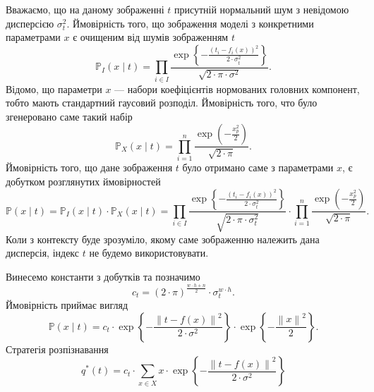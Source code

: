 Вважаємо, що на даному зображенні $t$
присутній нормальний шум з невідомою дисперсією $\sigma^2_t$.
Ймовірність того, що зображення моделі з конкретними параметрами $x$
є очищеним від шумів зображенням $t$
\begin{equation*}
  \mathbb{P}_I\left( x \mid t \right)
  = \prod_{i \in I}
    \frac{\exp{\left\{ - \frac{\left( t_i - f_i\left( x \right) \right)^2}
    {2 \cdot \sigma_t^2} \right\}}}{\sqrt{2 \cdot \pi \cdot \sigma^2}}.
\end{equation*}
Відомо, що параметри $x$ --- набори коефіцієнтів нормованих головних компонент,
тобто мають стандартний гаусовий розподіл.
Ймовірність того, что було згенеровано саме такий набір
\begin{equation*}
  \mathbb{P}_X\left( x \mid t \right)
  = \prod_{i=1}^n
    \frac{\exp{\left( - \frac{x_p^2}{2} \right)}}{\sqrt{2 \cdot \pi}}.
\end{equation*}
Ймовірність того,
що дане зображення $t$ було отримано саме з параметрами $x$,
є добутком розглянутих ймовірностей
\begin{equation*}
  \mathbb{P}\left( x \mid t \right)
  = \mathbb{P}_I\left( x \mid t \right)
    \cdot \mathbb{P}_X\left( x \mid t \right)
  = \prod_{i \in I}
    \frac{\exp{\left\{ - \frac{\left( t_i - f_i\left( x \right) \right)^2}
         {2 \cdot \sigma_t^2} \right\}}}{\sqrt{2 \cdot \pi \cdot \sigma_t^2}}
    \cdot
    \prod_{i=1}^n
    \frac{\exp{\left( - \frac{x_p^2}{2} \right)}}{\sqrt{2 \cdot \pi}}.
\end{equation*}
Коли з контексту буде зрозуміло,
якому саме зображенню належить дана дисперсія,
індекс $t$ не будемо використовувати.

Винесемо константи з добутків та позначимо
\begin{equation*}
  c_t = \left( 2 \cdot \pi \right)^{\frac{w \cdot h + n}{2}}
    \cdot \sigma_t^{w \cdot h}.
\end{equation*}
Ймовірність приймає вигляд
\begin{equation*}
  \mathbb{P}\left( x \mid t \right)
  = c_t
    \cdot \exp{\left\{ - \frac{\left\| t - f\left( x \right) \right\|^2}
                              {2 \cdot \sigma^2} \right\}}
    \cdot \exp{\left\{ - \frac{\left\| x \right\|^2}{2} \right\}}.
\end{equation*}
Стратегія розпізнавання
\begin{equation*}
  q^* \left( t \right)
  = c_t
    \cdot \sum_{x \in X}
      x
      \cdot \exp{\left\{ - \frac{\left\| t - f\left( x \right) \right\|^2}
                                {2 \cdot \sigma^2} \right\}}
\end{equation*}

